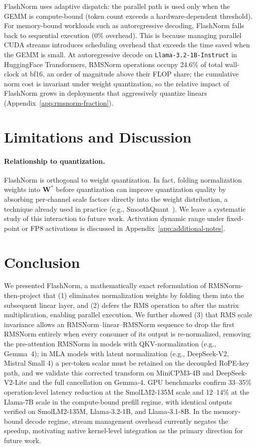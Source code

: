 \documentclass{article}
\begin{document}
FlashNorm uses adaptive dispatch: the parallel path is used only when the GEMM is compute-bound (token count exceeds a hardware-dependent threshold). For memory-bound workloads such as autoregressive decoding, FlashNorm falls back to sequential execution (0\% overhead). This is because managing parallel CUDA streams introduces scheduling overhead that exceeds the time saved when the GEMM is small. At autoregressive decode on \texttt{Llama-3.2-1B-Instruct} in HuggingFace Transformers, RMSNorm operations occupy 24.6\% of total wall-clock at bf16, an order of magnitude above their FLOP share; the cumulative norm cost is invariant under weight quantization, so the relative impact of FlashNorm grows in deployments that aggressively quantize linears (Appendix~\ref{app:rmsnorm-fraction}).

\section{Limitations and Discussion}\label{sec:limitations-discussion}

\paragraph{Relationship to quantization.}
FlashNorm is orthogonal to weight quantization. In fact, folding normalization
weights into $\mathbf{W}^*$ before quantization can improve quantization quality
by absorbing per-channel scale factors directly into the weight distribution,
a technique already used in practice (e.g., SmoothQuant~\citep{smoothQuant}). We leave a systematic
study of this interaction to future work. Activation dynamic range under fixed-point or
FP8 activations is discussed in Appendix~\ref{app:additional-notes}.

\section{Conclusion}
We presented FlashNorm, a mathematically exact reformulation of RMSNorm-then-project
that (1) eliminates normalization weights by folding them into the subsequent linear
layer, and (2) defers the RMS operation to after the matrix multiplication,
enabling parallel execution.
We further showed (3) that RMS scale invariance allows an RMSNorm--linear--RMSNorm sequence
to drop the first RMSNorm entirely when every consumer of its output is re-normalized,
removing the pre-attention RMSNorm in models with QKV-normalization (e.g., Gemma~4);
in MLA models with latent normalization (e.g., DeepSeek-V2, Mistral Small 4) a per-token
scalar must be retained on the decoupled RoPE-key path, and we validate this corrected
transform on MiniCPM3-4B and DeepSeek-V2-Lite and the full cancellation on Gemma-4.
GPU benchmarks confirm 33--35\% operation-level latency reduction at
the SmolLM2-135M scale and 12--14\% at the Llama-7B scale
in the compute-bound prefill regime, with identical outputs verified on
SmolLM2-135M, Llama-3.2-1B, and Llama-3.1-8B.
In the memory-bound decode regime, stream management overhead
currently negates the speedup, motivating native kernel-level integration as the
primary direction for future work.
\end{document}
